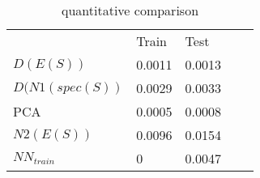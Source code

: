 \begin{table}[]
\begin{tabular}{lllll}
              & Train  & Test   &  &  \\
$D(E(S))$       & 0.0011 & 0.0013 &  &  \\
$D(N1(spec(S))$ & 0.0029 & 0.0033 &  &  \\
PCA           & 0.0005 & 0.0008 &  &  \\ \cline{1-3}
$N2(E(S))$      & 0.0096 & 0.0154 &  &  \\
$NN_{train}$ & 0      & 0.0047 &  & 
\end{tabular}
\caption{quantitative comparison}
\label{tab:quantitative}
\end{table}